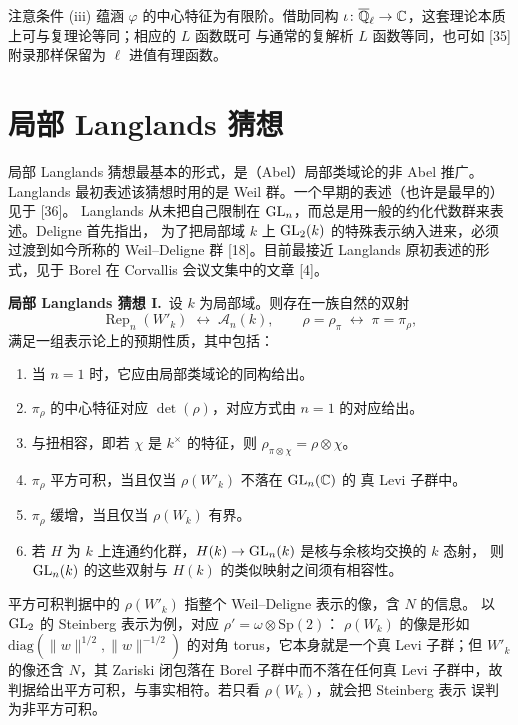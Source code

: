 注意条件 (iii) 蕴涵 $\varphi$ 的中心特征为有限阶。借助同构
$\iota\colon\overline{\mathbb{Q}}_\ell\to\mathbb{C}$，这套理论本质上可与复理论等同；相应的 $L$ 函数既可
与通常的复解析 $L$ 函数等同，也可如 [35] 附录那样保留为 $\ell$ 进值有理函数。

\section{局部 Langlands 猜想}

局部 Langlands 猜想最基本的形式，是（Abel）局部类域论的非 Abel 推广。
Langlands 最初表述该猜想时用的是 Weil 群。一个早期的表述（也许是最早的）见于 [36]。
Langlands 从未把自己限制在 $\mathrm{GL}_n$，而总是用一般的约化代数群来表述。Deligne 首先指出，
为了把局部域 $k$ 上 $\mathrm{GL}_2(k)$ 的特殊表示纳入进来，必须过渡到如今所称的
Weil--Deligne 群 [18]。目前最接近 Langlands 原初表述的形式，见于 Borel 在 Corvallis
会议文集中的文章 [4]。

\par\medskip\noindent\textbf{局部 Langlands 猜想 I.}\ 设 $k$ 为局部域。则存在一族自然的双射
\[
  \operatorname{Rep}_n(W'_k)\;\longleftrightarrow\;\mathcal{A}_n(k),
  \qquad \rho=\rho_\pi\;\longleftrightarrow\;\pi=\pi_\rho,
\]
满足一组表示论上的预期性质，其中包括：
\begin{enumerate}[label=(\roman*),leftmargin=*]
  \item 当 $n=1$ 时，它应由局部类域论的同构给出。
  \item $\pi_\rho$ 的中心特征对应 $\det(\rho)$，对应方式由 $n=1$ 的对应给出。
  \item 与扭相容，即若 $\chi$ 是 $k^\times$ 的特征，则
    $\rho_{\pi\otimes\chi}=\rho\otimes\chi$。
  \item $\pi_\rho$ 平方可积，当且仅当 $\rho(W'_k)$ 不落在 $\mathrm{GL}_n(\mathbb{C})$ 的
    真 Levi 子群中。
  \item $\pi_\rho$ 缓增，当且仅当 $\rho(W_k)$ 有界。
  \item 若 $H$ 为 $k$ 上连通约化群，$H(k)\to\mathrm{GL}_n(k)$ 是核与余核均交换的 $k$ 态射，
    则 $\mathrm{GL}_n(k)$ 的这些双射与 $H(k)$ 的类似映射之间须有相容性。
\end{enumerate}
\par\medskip
\begin{annote}
平方可积判据中的 $\rho(W'_k)$ 指整个 Weil--Deligne 表示的像，含 $N$ 的信息。
以 $\mathrm{GL}_2$ 的 Steinberg 表示为例，对应 $\rho'=\omega\otimes\mathrm{Sp}(2)$：
$\rho(W_k)$ 的像是形如
$\mathrm{diag}(\|w\|^{1/2},\|w\|^{-1/2})$ 的对角 torus，它本身就是一个真 Levi
子群；但 $W'_k$ 的像还含 $N$，其 Zariski 闭包落在 Borel 子群中而不落在任何真 Levi
子群中，故判据给出平方可积，与事实相符。若只看 $\rho(W_k)$，就会把 Steinberg 表示
误判为非平方可积。
\par{}
\end{annote}

